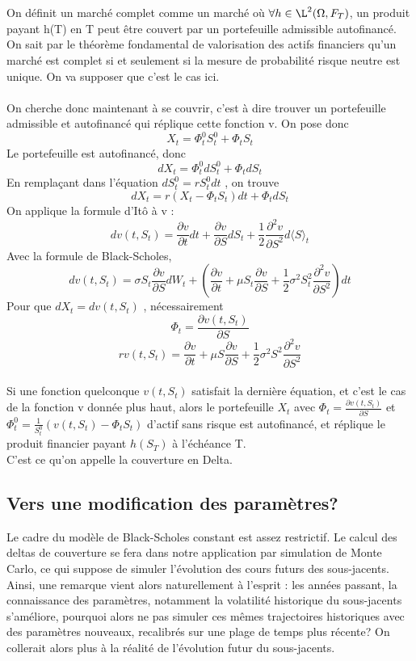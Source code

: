 \documentclass[french,12pt,a4paper]{article}
\begin{document}
 \\ \\
On définit un marché complet comme un marché où  $ \forall h \in \L^2 (\Omega, F_T) $, un produit payant h(T) en T peut être couvert par un portefeuille admissible autofinancé. On sait par le théorème fondamental de valorisation des actifs financiers qu'un marché est complet si et seulement si la mesure de probabilité risque neutre est unique. On va supposer que c'est le cas ici.
\\ \\
On cherche donc maintenant à se couvrir, c'est à dire trouver un portefeuille admissible et autofinancé qui réplique cette fonction v. On pose donc
$$ X_t = \Phi_{t}^0 S_{t}^0  + \Phi_t S_{t}  $$
Le portefeuille est autofinancé, donc
$$ dX_t = \Phi_{t}^0 dS_{t}^0  + \Phi_t dS_{t} $$
En remplaçant dans l'équation $ dS_{t}^0 = r S_{t}^0 dt $ , on trouve
$$ dX_t = r(X_t - \Phi_t S_{t} )dt + \Phi_t dS_{t}  $$
On applique la formule d'Itô à v :
$$ dv(t,S_t) = \frac{\partial v}{\partial t}dt + \frac{\partial v}{\partial S}dS_t + \frac{1}{2} \frac{\partial^2 v}{\partial S^2} d \langle S \rangle_t   $$
Avec la formule de Black-Scholes,
$$ dv(t,S_t) = \sigma S_t \frac{\partial v}{\partial S} dW_t + \left (  \frac{\partial v}{\partial t} + \mu S_t   \frac{\partial v}{\partial S} +  \frac{1}{2} \sigma^2 S_{t}^2 \frac{\partial^2 v}{\partial S^2} \right ) dt	$$
Pour que $ dX_t = dv(t,S_t) $ , nécessairement
$$ \Phi_t = \frac{\partial v(t,S_t)}{\partial S} $$
$$ rv(t,S_t) = \frac{\partial v}{\partial t} + \mu S  \frac{\partial v}{\partial S} +  \frac{1}{2} \sigma^2 S^2 \frac{\partial^2 v}{\partial S^2} $$ \\
Si une fonction quelconque $ v(t,S_t) $ satisfait la dernière équation, et c'est le cas de la fonction v donnée plus haut, alors le portefeuille $ X_t $ avec $ \Phi_t = \frac{\partial v(t,S_t)}{\partial S} $ et $ \Phi_{t}^0  = \frac{1}{S_{t}^0} (v(t,S_t) - \Phi_t S_t )$ d'actif sans risque est autofinancé, et réplique le produit financier payant $ h(S_T) $ à l'échéance T.  \\
C'est ce qu'on appelle la couverture en Delta.

\subsection{Vers une modification des paramètres?}

Le cadre du modèle de Black-Scholes constant est assez restrictif. Le calcul des deltas de couverture se fera dans notre application par simulation de Monte Carlo, ce qui suppose de simuler l’évolution des cours futurs des sous-jacents. Ainsi, une remarque vient alors naturellement à l'esprit : les années passant, la connaissance des paramètres, notamment la volatilité historique du sous-jacents s’améliore, pourquoi alors ne pas simuler ces mêmes trajectoires historiques avec des paramètres nouveaux, recalibrés sur une plage de temps plus récente? On collerait alors plus à la réalité de l'évolution futur du sous-jacents.\\
\end{document}
